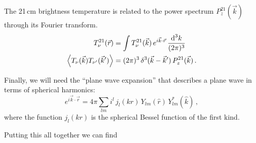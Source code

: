 \begin{bibunit}
\begin{subappendices}
The 21\,cm brightness temperature is related to the power spectrum $P^{21}_z(\vec k)$ through its
Fourier transform.
\begin{align}
    T^{21}_\nu(\vec r) &=
        \int T^{21}_\nu(\vec k) \, e^{i\vec k\cdot\vec r} \, \frac{{\textrm d}^3k}{(2\pi)^3} \\
    \left\langle T_\nu(\vec k) T_{\nu^\prime}(\vec k^\prime) \right\rangle &=
        (2\pi)^3 \, \delta^3(\vec k - \vec k^\prime) \, P^{21}_z(\vec k)\,.
\end{align}

Finally, we will need the ``plane wave expansion'' that describes a plane wave in terms of spherical
harmonics:
\begin{equation}
    e^{i\vec k\cdot\vec r} = 4\pi \sum_{lm} i^l \, j_l(kr) \, Y_{lm}(\hat r) \, Y^*_{lm}(\hat k)\,,
\end{equation}
where the function $j_l(kr)$ is the spherical Bessel function of the first kind.

Putting this all together we can find



\end{subappendices}
\end{bibunit}
